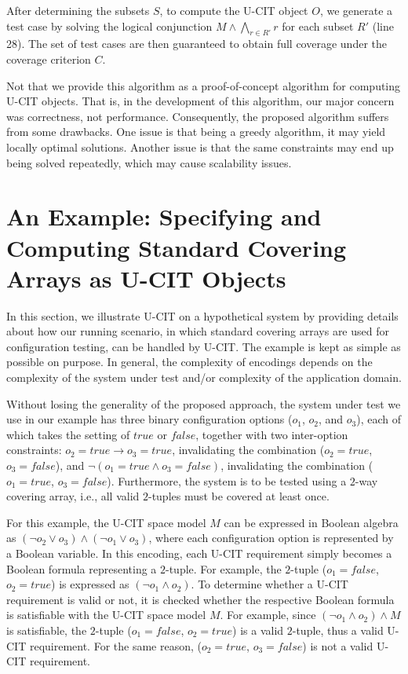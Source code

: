 \documentclass[EPiCempty]{easychair}
\begin{document}
After determining the subsets $S$, to compute the U-CIT object $O$, we generate a test case by solving the logical conjunction $M \wedge \bigwedge_{r \in R'}r$ for each subset $R'$ (line 28). The set of test cases are then guaranteed to obtain full coverage under the coverage criterion $C$.

Not that we provide this algorithm as a proof-of-concept algorithm for computing U-CIT objects. That is, in the development of this algorithm, our major concern was correctness, not performance. Consequently, the proposed algorithm suffers from some drawbacks. One issue is that being a greedy algorithm, it may yield locally optimal solutions. Another issue is that the same constraints may end up being solved repeatedly, which may cause scalability issues.

\section{An Example: Specifying and Computing Standard Covering Arrays as U-CIT Objects} \label{exampleTCA}

In this section, we illustrate U-CIT on a hypothetical system  by providing details about how our running scenario, in which standard covering arrays are used for configuration testing, can be handled by U-CIT. The example is kept as simple as possible on purpose. In general, the complexity of encodings depends on the complexity of the system under test and/or complexity of the application domain.

Without losing the generality of the proposed approach, the system under test we use in our example has three binary configuration options ($o_1$, $o_2$, and $o_3$), each of which takes the setting of $true$ or $false$, together with two inter-option constraints: $o_2=true \rightarrow o_3=true$, invalidating the combination ($o_2=true$, $o_3=false$), and $\neg (o_1=true \wedge o_3=false)$, invalidating the combination ($o_1=true$, $o_3=false$). Furthermore, the system is to be tested using a $2$-way covering array, i.e., all valid $2$-tuples must be covered at least once. 

For this example, the U-CIT space model $M$ can be  expressed in Boolean algebra as $(\neg o_2 \vee o_3) \wedge (\neg o_1 \vee o_3)$, where each configuration option is represented by a Boolean variable. In this encoding, each U-CIT requirement simply becomes a Boolean formula representing a $2$-tuple. For example, the $2$-tuple ($o_1=false$, $o_2=true$) is expressed as $(\neg o_1 \wedge o_2)$. To determine whether a U-CIT requirement is valid or not, it is checked whether the respective Boolean formula is satisfiable with the U-CIT space model $M$. For example, since $(\neg o_1 \wedge o_2) \wedge M$ is satisfiable, the $2$-tuple ($o_1=false$, $o_2=true$) is a valid $2$-tuple, thus a valid U-CIT  requirement. For the same reason, ($o_2=true$, $o_3=false$) is not a valid U-CIT requirement. 
\end{document}
